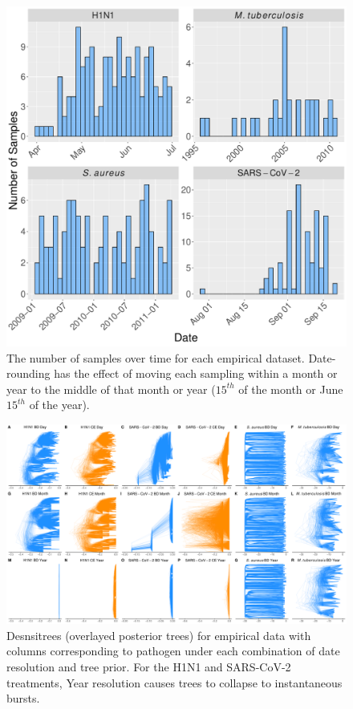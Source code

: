 \documentclass[12pt]{article}
\begin{document}
\renewcommand{\thefigure}{S\arabic{figure}}
\renewcommand{\thetable}{S\arabic{table}}
\setcounter{figure}{0}
\setcounter{table}{0}

\begin{figure}[H]
    \centering
    \includegraphics[width=\textwidth]{figures/empirical_sampling_times.pdf}
    \caption{The number of samples over time for each empirical dataset. Date-rounding has the effect of moving each sampling within a month or year to the middle of that month or year ($15^{th}$ of the month or June $15^{th}$ of the year).}
    \label{fig:sampling}
\end{figure}

\begin{figure}[H]
    \centering
    \includegraphics[width=\textwidth]{empirical_densitrees.pdf}
    \caption{Desnsitrees (overlayed posterior trees) for empirical data with columns corresponding to pathogen under each combination of date resolution and tree prior. For the H1N1 and SARS-CoV-2 treatments, Year resolution causes trees to collapse to instantaneous bursts.}
    \label{fig:densitree}
\end{figure}
\end{document}
